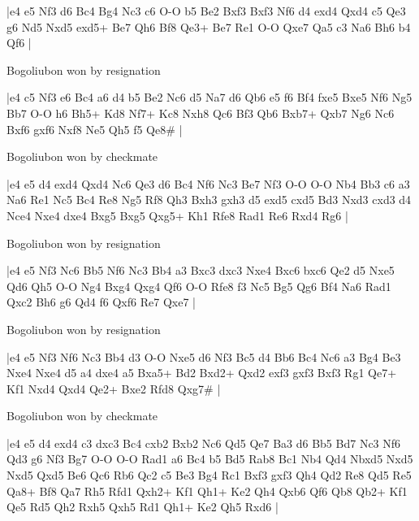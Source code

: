 \makegametitle
|e4 e5 Nf3 d6 Bc4 Bg4 Nc3 c6 O-O b5 Be2 Bxf3 Bxf3 Nf6 d4 exd4 Qxd4 c5 Qe3 g6 Nd5 Nxd5 exd5+ Be7 Qh6 Bf8 Qe3+ Be7 Re1 O-O Qxe7 Qa5 c3 Na6 Bh6 b4 Qf6  |

\showboard

Bogoliubon won by resignation

\makegametitle
|e4 c5 Nf3 e6 Bc4 a6 d4 b5 Be2 Nc6 d5 Na7 d6 Qb6 e5 f6 Bf4 fxe5 Bxe5 Nf6 Ng5 Bb7 O-O h6 Bh5+ Kd8 Nf7+ Kc8 Nxh8 Qc6 Bf3 Qb6 Bxb7+ Qxb7 Ng6 Nc6 Bxf6 gxf6 Nxf8 Ne5 Qh5 f5 Qe8\#  |

\showboard

Bogoliubon won by checkmate

\makegametitle
|e4 e5 d4 exd4 Qxd4 Nc6 Qe3 d6 Bc4 Nf6 Nc3 Be7 Nf3 O-O O-O Nb4 Bb3 c6 a3 Na6 Re1 Nc5 Bc4 Re8 Ng5 Rf8 Qh3 Bxh3 gxh3 d5 exd5 cxd5 Bd3 Nxd3 cxd3 d4 Nce4 Nxe4 dxe4 Bxg5 Bxg5 Qxg5+ Kh1 Rfe8 Rad1 Re6 Rxd4 Rg6  |

\showboard

Bogoliubon won by resignation

\makegametitle
|e4 e5 Nf3 Nc6 Bb5 Nf6 Nc3 Bb4 a3 Bxc3 dxc3 Nxe4 Bxc6 bxc6 Qe2 d5 Nxe5 Qd6 Qh5 O-O Ng4 Bxg4 Qxg4 Qf6 O-O Rfe8 f3 Nc5 Bg5 Qg6 Bf4 Na6 Rad1 Qxc2 Bh6 g6 Qd4 f6 Qxf6 Re7 Qxe7  |

\showboard

Bogoliubon won by resignation

\makegametitle
|e4 e5 Nf3 Nf6 Nc3 Bb4 d3 O-O Nxe5 d6 Nf3 Bc5 d4 Bb6 Bc4 Nc6 a3 Bg4 Be3 Nxe4 Nxe4 d5 a4 dxe4 a5 Bxa5+ Bd2 Bxd2+ Qxd2 exf3 gxf3 Bxf3 Rg1 Qe7+ Kf1 Nxd4 Qxd4 Qe2+ Bxe2 Rfd8 Qxg7\#  |

\showboard

Bogoliubon won by checkmate

\makegametitle
|e4 e5 d4 exd4 c3 dxc3 Bc4 cxb2 Bxb2 Nc6 Qd5 Qe7 Ba3 d6 Bb5 Bd7 Nc3 Nf6 Qd3 g6 Nf3 Bg7 O-O O-O Rad1 a6 Bc4 b5 Bd5 Rab8 Bc1 Nb4 Qd4 Nbxd5 Nxd5 Nxd5 Qxd5 Be6 Qc6 Rb6 Qc2 c5 Be3 Bg4 Rc1 Bxf3 gxf3 Qh4 Qd2 Re8 Qd5 Re5 Qa8+ Bf8 Qa7 Rh5 Rfd1 Qxh2+ Kf1 Qh1+ Ke2 Qh4 Qxb6 Qf6 Qb8 Qb2+ Kf1 Qe5 Rd5 Qh2 Rxh5 Qxh5 Rd1 Qh1+ Ke2 Qh5 Rxd6  |

